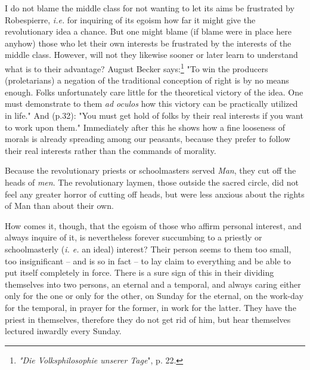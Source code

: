 I do not blame the middle class for not wanting to let its aims be frustrated 
by Robespierre, \textit{i.e.} for inquiring of its egoism how far it might 
give the revolutionary idea a chance. But one might blame (if blame were in 
place here anyhow) those who let their own interests be frustrated by the 
interests of the middle class. However, will not they likewise sooner or later 
learn to understand what is to their advantage? August Becker 
says:\footnote{\textit{"{}Die Volksphilosophie unserer Tage}"{}, p. 22.} "{}To 
win the producers (proletarians) a negation of the traditional conception of 
right is by no means enough. Folks unfortunately care little for the 
theoretical victory of the idea. One must demonstrate to them \textit{ad 
oculos} how this victory can be practically utilized in life."{} And (p.32): 
"{}You must get hold of folks by their real interests if you want to work upon 
them."{} Immediately after this he shows how a fine looseness of morals is 
already spreading among our peasants, because they prefer to follow their real 
interests rather than the commands of morality.

Because the revolutionary priests or schoolmasters served \textit{Man}, they 
cut off the heads of \textit{men}. The revolutionary laymen, those outside the 
sacred circle, did not feel any greater horror of cutting off heads, but were 
less anxious about the rights of Man than about their own.

How comes it, though, that the egoism of those who affirm personal interest, 
and always inquire of it, is nevertheless forever succumbing to a priestly or 
schoolmasterly (\textit{i. e.} an ideal) interest? Their person seems to them 
too small, too insignificant -- and is so in fact -- to lay claim to 
everything and be able to put itself completely in force. There is a sure sign 
of this in their dividing themselves into two persons, an eternal and a 
temporal, and always caring either only for the one or only for the other, on 
Sunday for the eternal, on the work-day for the temporal, in prayer for the 
former, in work for the latter. They have the priest in themselves, therefore 
they do not get rid of him, but hear themselves lectured inwardly every 
Sunday.

